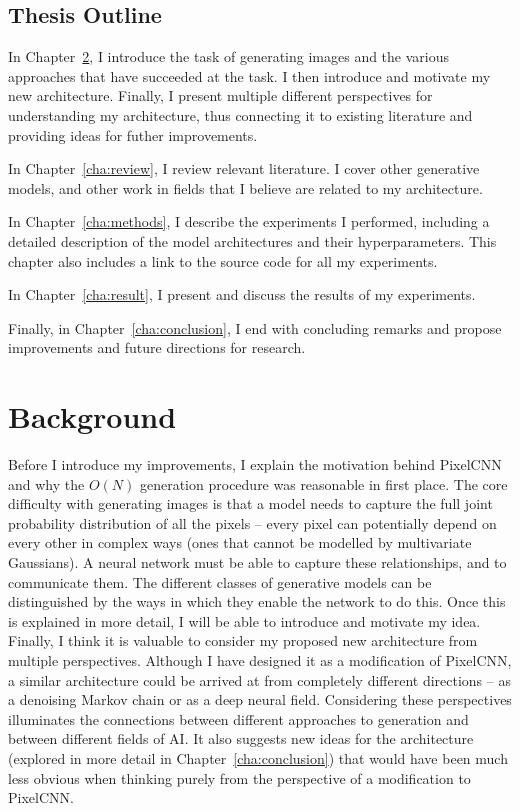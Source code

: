 \documentclass[11pt, a4paper, openany]{book}
\begin{document}
\section{Thesis Outline}
\label{sec:outline}
In Chapter~\ref{cha:background}, I introduce the task of generating images and the various approaches that have succeeded at the task. I then introduce and motivate my new architecture. Finally, I present multiple different perspectives for understanding my architecture, thus connecting it to existing literature and providing ideas for futher improvements.

In Chapter~\ref{cha:review}, I review relevant literature. I cover other generative models, and other work in fields that I believe are related to my architecture.

In Chapter~\ref{cha:methods}, I describe the experiments I performed, including a detailed description of the model architectures and their hyperparameters. This chapter also includes a link to the source code for all my experiments.

In Chapter~\ref{cha:result}, I present and discuss the results of my experiments.

Finally, in Chapter~\ref{cha:conclusion}, I end with concluding remarks and propose improvements and future directions for research.

\chapter{Background}
\label{cha:background}
Before I introduce my improvements, I explain the motivation behind PixelCNN and why the $O(N)$ generation procedure was reasonable in first place. The core difficulty with generating images is that a model needs to capture the full joint probability distribution of all the pixels -- every pixel can potentially depend on every other in complex ways (ones that cannot be modelled by multivariate Gaussians). A neural network must be able to capture these relationships, and to communicate them. The different classes of generative models can be distinguished by the ways in which they enable the network to do this. Once this is explained in more detail, I will be able to introduce and motivate my idea. Finally, I think it is valuable to consider my proposed new architecture from multiple perspectives. Although I have designed it as a modification of PixelCNN, a similar architecture could be arrived at from completely different directions -- as a denoising Markov chain or as a deep neural field. Considering these perspectives illuminates the connections between different approaches to generation and between different fields of AI. It also suggests new ideas for the architecture (explored in more detail in Chapter~\ref{cha:conclusion}) that would have been much less obvious when thinking purely from the perspective of a modification to PixelCNN.
\end{document}
